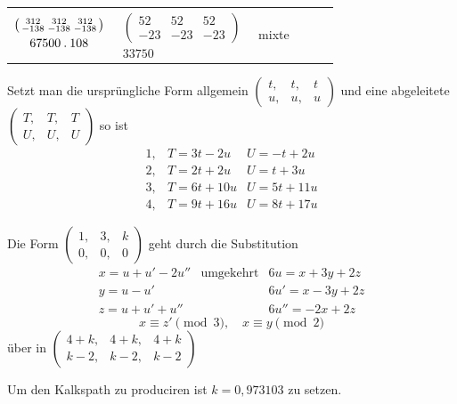 \begin{center}
\begin{tabular}{ccccc l}
$\begin{gathered}\left(\begin{smallmatrix}312&312&312\\-138&-138&-138\end{smallmatrix}\right)\\67500\mathbin{.}108\end{gathered}$&
$\begin{gathered}\left(\begin{smallmatrix}52&52&52\\-23&-23&-23\end{smallmatrix}\right)\\33750\end{gathered}$&mixte
\end{tabular}\end{center}

Setzt man die ursprüngliche Form allgemein $\left(\begin{smallmatrix}t,&t,&t\\u,&u,&u\end{smallmatrix}\right)$ und eine abgeleitete $\left(\begin{smallmatrix}T,&T,&T\\U,&U,&U\end{smallmatrix}\right)$ so ist
\[
\begin{array}{rll}
1,&T=3t-2u&U=-t+2u\\
2,&T=2t+2u&U=t+3u\\
3,&T=6t+10u&U=5t+11u\\
4,&T=9t+16u&U=8t+17u
\end{array}
\]

Die Form $\left(\begin{smallmatrix}1,&3,&k\\0,&0,&0\end{smallmatrix}\right)$ geht durch die Substitution
\[
\begin{array}{lll}
x=u+u'-2u''&\text{umgekehrt}&6u=x+3y+2z\\
y=u-u'&&6u'=x-3y+2z\\
z=u+u'+u''&&6u''=-2x+2z
\end{array}
\]
\[
x\equiv z'\pmod3,\quad x\equiv y\pmod2
\]
über in $\left(\begin{smallmatrix}4+k,&4+k,&4+k\\k-2,&k-2,&k-2\end{smallmatrix}\right)$

Um den Kalkspath zu produciren ist $k=0{,}973103$ zu setzen.


